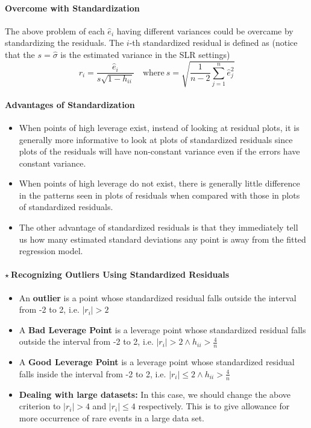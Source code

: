 \documentclass[10pt]{article}
\begin{document}
\paragraph{Overcome with Standardization} The above problem of each $\hat{e}_i$ having different variances could be overcame by standardizing the residuals. The $i$-th standardized residual is defined as (notice that the $s = \hat{\sigma}$ is the estimated variance in the SLR settings)
\begin{equation*}
    r_{i}=\frac{\hat{e}_{i}}{s \sqrt{1-h_{i i}}}\quad \text{where}~ s=\sqrt{\frac{1}{n-2} \sum_{j=1}^{n} \hat{e}_{j}^{2}}
\end{equation*}

\paragraph{Advantages of Standardization} 
\begin{itemize}
    \item When points of high leverage exist, instead of looking at residual plots, it is generally more informative to look at plots of standardized residuals since plots of the residuals will have non-constant variance even if the errors have constant variance.
    \item When points of high leverage do not exist, there is generally little difference in the patterns seen in plots of residuals when compared with those in plots of standardized residuals.
    \item The other advantage of standardized residuals is that they immediately tell us how many estimated standard deviations any point is away from the fitted regression model. 
\end{itemize}

\color{RawSienna}
\paragraph{$\star~$Recognizing Outliers Using Standardized Residuals} 
\begin{itemize}
    \item An \textbf{outlier} is a point whose standardized residual falls outside the interval from -2 to 2, i.e. $|r_i| > 2$
    \item A \textbf{Bad Leverage Point} is a leverage point whose standardized residual falls outside the interval from -2 to 2, i.e. $|r_i| > 2 \wedge h_{ii} > \frac{4}{n}$
    \item A \textbf{Good Leverage Point} is a leverage point whose standardized residual falls inside the interval from -2 to 2, i.e. $|r_i| \leq 2 \wedge h_{ii} > \frac{4}{n}$
    \item \textbf{Dealing with large datasets:} In this case, we should change the above criterion to $|r_i| > 4$ and $|r_i| \leq 4$ respectively. This is to give allowance for more occurrence of rare events in a large data set.
\end{itemize}
\color{Black}
\end{document}
